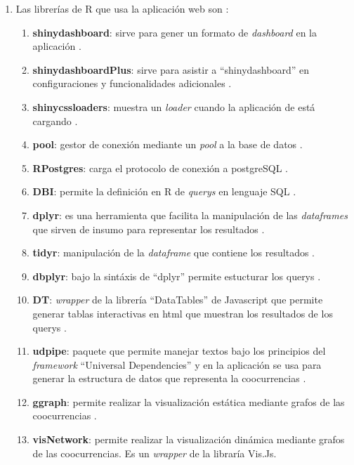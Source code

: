 \documentclass[
  12pt,
  openany]{book}
\begin{document}
\begin{enumerate}
\def\labelenumi{\arabic{enumi}.}
\item
  Las librerías de R que usa la aplicación web son :

  \begin{enumerate}
  \def\labelenumii{\arabic{enumii}.}
  \item
    \textbf{shinydashboard}: sirve para gener un formato de \emph{dashboard} en la aplicación \citep{shinydashboard}.
  \item
    \textbf{shinydashboardPlus}: sirve para asistir a ``shinydashboard'' en configuraciones y funcionalidades adicionales \citep{shinydashboardPlus}.
  \item
    \textbf{shinycssloaders}: muestra un \emph{loader} cuando la aplicación de está cargando \citep{shinycssloaders}.
  \item
    \textbf{pool}: gestor de conexión mediante un \emph{pool} a la base de datos \citep{pool}.
  \item
    \textbf{RPostgres}: carga el protocolo de conexión a postgreSQL \citep{RPostgres}.
  \item
    \textbf{DBI}: permite la definición en R de \emph{querys} en lenguaje SQL \citep{DBI}.
  \item
    \textbf{dplyr}: es una herramienta que facilita la manipulación de las \emph{dataframes} que sirven de insumo para representar los resultados \citep{dplyr}.
  \item
    \textbf{tidyr}: manipulación de la \emph{dataframe} que contiene los resultados \citep{tidyr}.
  \item
    \textbf{dbplyr}: bajo la sintáxis de ``dplyr'' permite estucturar los querys \citep{dbplyr}.
  \item
    \textbf{DT}: \emph{wrapper} de la librería ``DataTables'' de Javascript que permite generar tablas interactivas en html que muestran los resultados de los querys \citep{DT-2}.
  \item
    \textbf{udpipe}: paquete que permite manejar textos bajo los principios del \emph{framework} ``Universal Dependencies'' y en la aplicación se usa para generar la estructura de datos que representa la coocurrencias \citep{udpipe-3}.
  \item
    \textbf{ggraph}: permite realizar la visualización estática mediante grafos de las coocurrencias \citep{ggraph-2}.
  \item
    \textbf{visNetwork}: permite realizar la visualización dinámica mediante grafos de las coocurrencias. Es un \emph{wrapper} de la libraría Vis.Js.

\end{enumerate}
\end{enumerate}
\end{document}
